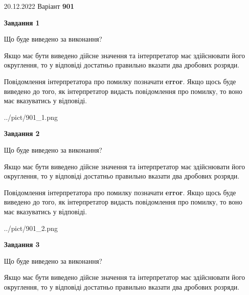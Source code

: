 \documentclass[12pt, ukrainian]{article}
\begin{document}
{20.12.2022 Варіант \No \textbf { 901 }\par}
{
\begin {Large}

{\begin {center}\textbf{Завдання 1}\end {center}}\par
Що буде виведено за виконання? \par

Якщо має бути виведено дійсне значення та інтерпретатор має здійснювати його округлення, 
то у відповіді достатньо правильно вказати два дробових розряди.

Повідомлення інтерпретатора про помилку позначати \textbf{error}.
Якщо щось буде виведено до того, як інтерпретатор видасть повідомлення про помилку, 
то воно має вказуватись у відповіді. \par

\begin{center}
	{../pict/901_1.png}
\end{center}
\newpage

{\begin {center}\textbf{Завдання 2}\end {center}}\par
Що буде виведено за виконання? \par

Якщо має бути виведено дійсне значення та інтерпретатор має здійснювати його округлення, 
то у відповіді достатньо правильно вказати два дробових розряди.

Повідомлення інтерпретатора про помилку позначати \textbf{error}.
Якщо щось буде виведено до того, як інтерпретатор видасть повідомлення про помилку, 
то воно має вказуватись у відповіді. \par

\begin{center}
	{../pict/901_2.png}
\end{center}
\newpage

{\begin {center}\textbf{Завдання 3}\end {center}}\par
Що буде виведено за виконання? \par

Якщо має бути виведено дійсне значення та інтерпретатор має здійснювати його округлення, 
то у відповіді достатньо правильно вказати два дробових розряди.


\end{Large}}
\end{document}
